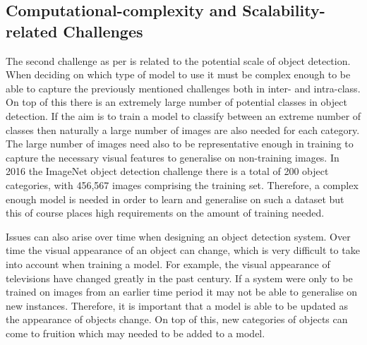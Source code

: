\subsection{Computational-complexity and Scalability-related Challenges}
The second challenge as per \cite{zhang} is related to the potential scale of object detection. When deciding on which type of model to use it must be complex enough to be able to capture the previously mentioned challenges both in inter- and intra-class. On top of this there is an extremely large number of potential classes in object detection. If the aim is to train a model to classify between an extreme number of classes then naturally a large number of images are also needed for each category. The large number of images need also to be representative enough in training to capture the necessary visual features to generalise on non-training images. In 2016 the ImageNet object detection challenge there is a total of 200 object categories, with 456,567 images comprising the training set. Therefore, a complex enough model is needed in order to learn and generalise on such a dataset but this of course places high requirements on the amount of training needed.

Issues can also arise over time when designing an object detection system.  Over time the visual appearance of an object can change, which is very difficult to take into account when training a model. For example, the visual appearance of televisions have changed greatly in the past century. If a system were only to be trained on images from an earlier time period it may not be able to generalise on new instances. Therefore, it is important that a model is able to be updated as the appearance of objects change. On top of this, new categories of objects can come to fruition which may needed to be added to a model. 

